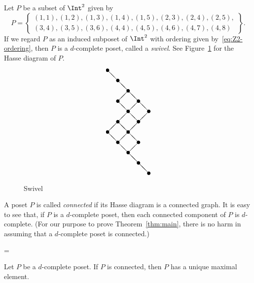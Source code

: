 \begin{exam}
\label{ex:swivel}
Let $P$ be a subset of $\Int^2$ given by
$$
P =
\left\{ 
 \begin{array}{l}
 (1,1), (1,2), (1,3), (1,4), (1,5), (2,3), (2,4), (2,5), \\
 (3,4), (3,5), (3,6), (4,4), (4,5), (4,6), (4,7), (4,8)
 \end{array}
\right\}.
$$
If we regard $P$ as an induced subposet of $\Int^2$ with ordering given by~\eqref{eq:Z2-ordering}, 
then $P$ is a $d$-complete poset, called a \emph{swivel}.
See Figure~\ref{fig:Hasse_swivel} for the Hasse diagram of $P$.
\begin{figure}[!htb]
$$
\setlength{\unitlength}{1.5pt}
\begin{picture}(40,100)
\put(0,100){\circle*{3}}
\put(0,40){\circle*{3}}
\put(10,90){\circle*{3}}
\put(10,70){\circle*{3}}
\put(10,50){\circle*{3}}
\put(10,30){\circle*{3}}
\put(20,80){\circle*{3}}
\put(20,60){\circle*{3}}
\put(20,40){\circle*{3}}
\put(20,20){\circle*{3}}
\put(30,70){\circle*{3}}
\put(30,50){\circle*{3}}
\put(30,30){\circle*{3}}
\put(30,10){\circle*{3}}
\put(40,60){\circle*{3}}
\put(40,0){\circle*{3}}
\put(0,100){\line(1,-1){10}}
\put(0,40){\line(1,1){10}}
\put(0,40){\line(1,-1){10}}
\put(10,90){\line(1,-1){10}}
\put(10,70){\line(1,1){10}}
\put(10,70){\line(1,-1){10}}
\put(10,50){\line(1,1){10}}
\put(10,50){\line(1,-1){10}}
\put(10,30){\line(1,1){10}}
\put(10,30){\line(1,-1){10}}
\put(20,80){\line(1,-1){10}}
\put(20,60){\line(1,1){10}}
\put(20,60){\line(1,-1){10}}
\put(20,40){\line(1,1){10}}
\put(20,40){\line(1,-1){10}}
\put(20,20){\line(1,1){10}}
\put(20,20){\line(1,-1){10}}
\put(30,70){\line(1,-1){10}}
\put(30,50){\line(1,1){10}}
\put(30,10){\line(1,-1){10}}
\end{picture}
$$
\caption{Swivel}
\label{fig:Hasse_swivel}
\end{figure}
\end{exam}

A poset $P$ is called \emph{connected} if its Hasse diagram is a connected graph.
It is easy to see that, if $P$ is a $d$-complete poset, 
then each connected component of $P$ is $d$-complete.
(For our purpose to prove Theorem~\ref{thm:main}, 
there is no harm in assuming that a $d$-complete poset is connected.)

\newbox\toto
\setbox\toto=\hbox{\cite[\S~3]{Proc1}}
\begin{prop}[\box\toto]
\label{prop:dc_connected}
Let $P$ be a $d$-complete poset.
If $P$ is connected, then $P$ has a unique maximal element.
\end{prop}

